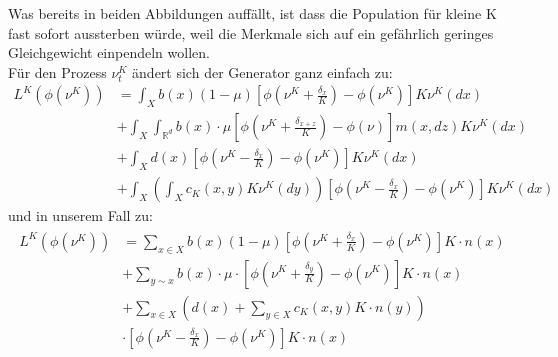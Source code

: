 \documentclass[11pt, a4paper, german]{article}
\theoremstyle{plain}
\begin{document}
	Was bereits in beiden Abbildungen auffällt, ist dass die Population für kleine K fast sofort aussterben würde, weil die Merkmale sich auf ein gefährlich geringes Gleichgewicht einpendeln wollen.\\
	Für den Prozess $ \nu_t^K $ ändert sich der Generator ganz einfach zu:
	\begin{align*}
		L^K(\phi(\nu^K)) &= \int_{X} b(x)(1-\mu)\left[\phi\left(\nu^K + \frac{\delta_x}{K}\right) - \phi(\nu^K)\right]K\nu^K(dx)\\
			  &+ \int_{X}\int_{\mathbb{R}^d} b(x) \cdot \mu \left[\phi\left(\nu^K + \frac{\delta_{x+z}}{K}\right) - \phi(\nu)\right] m(x,dz) K \nu^K(dx)\\
		  	  &+ \int_{X} d(x)\left[\phi\left(\nu^K - \frac{\delta_x}{K}\right) - \phi(\nu^K)\right]K\nu^K(dx)\\
		 	  &+ \int_{X} \left( \int_{X} c_K(x,y) K \nu^K(dy) \right) \left[\phi(\nu^K - \frac{\delta_x}{K}) - \phi(\nu^K)\right]K\nu^K(dx)
	\end{align*}
	und in unserem Fall zu:
	\begin{align}
	\begin{split}
			L^K(\phi(\nu^K)) &= \sum_{x \in X} b(x)(1-\mu)\left[\phi\left(\nu^K + \frac{\delta_x}{K}\right) - \phi(\nu^K)\right]K \cdot n(x)\\
			&+ \sum_{y \sim x}b(x) \cdot \mu \cdot 
		 \left[\phi\left(\nu^K + \frac{\delta_y}{K}\right) - \phi(\nu^K)\right]K \cdot n(x)\\		 
			&+ \sum_{x \in X} \left(d(x) + \sum_{y \in X} c_K(x,y) K \cdot n(y)\right)\\
			&\cdot \left[\phi\left(\nu^K - \frac{\delta_x}{K}\right) - \phi(\nu^K)\right]K \cdot n(x) \label{GeneratorDiskretK}
	\end{split}
	\end{align}
\end{document}
